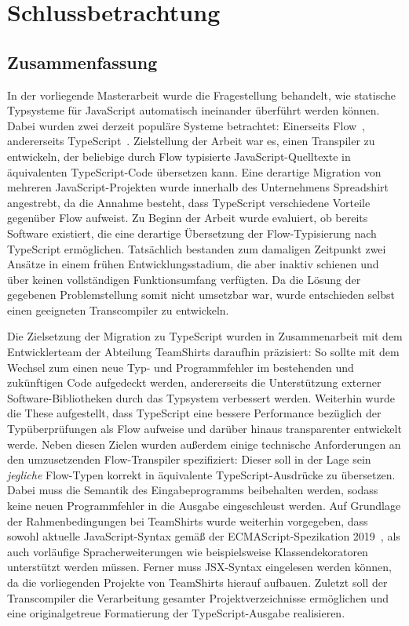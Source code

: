 \chapter{Schlussbetrachtung}
\label{chap:conclusion}

\section{Zusammenfassung}

In der vorliegende Masterarbeit wurde die Fragestellung behandelt, wie statische Typsysteme für JavaScript automatisch ineinander überführt werden können. Dabei wurden zwei derzeit populäre Systeme betrachtet: Einerseits Flow~\autocite{FLOW:PAPER}, andererseits TypeScript~\autocite{TYPESCRIPT:SPEC}. Zielstellung der Arbeit war es, einen Transpiler zu entwickeln, der beliebige durch Flow typisierte JavaScript-Quelltexte in äquivalenten TypeScript-Code übersetzen kann. Eine derartige Migration von mehreren JavaScript-Projekten wurde innerhalb des Unternehmens Spreadshirt angestrebt, da die Annahme besteht, dass TypeScript verschiedene Vorteile gegenüber Flow aufweist. Zu Beginn der Arbeit wurde evaluiert, ob bereits Software existiert, die eine derartige Übersetzung der Flow-Typisierung nach TypeScript ermöglichen. Tatsächlich bestanden zum damaligen Zeitpunkt zwei Ansätze in einem frühen Entwicklungsstadium, die aber inaktiv schienen und über keinen vollständigen Funktionsumfang verfügten. Da die Lösung der gegebenen Problemstellung somit nicht umsetzbar war, wurde entschieden selbst einen geeigneten Transcompiler zu entwickeln.

Die Zielsetzung der Migration zu TypeScript wurden in Zusammenarbeit mit dem Entwicklerteam der Abteilung TeamShirts daraufhin präzisiert: So sollte mit dem Wechsel zum einen neue Typ- und Programmfehler im bestehenden und zukünftigen Code aufgedeckt werden, andererseits die Unterstützung externer Software-Bibliotheken durch das Typsystem verbessert werden. Weiterhin wurde die These aufgestellt, dass TypeScript eine bessere Performance bezüglich der Typüberprüfungen als Flow aufweise und darüber hinaus transparenter entwickelt werde. Neben diesen Zielen wurden außerdem einige technische Anforderungen an den umzusetzenden Flow-Transpiler spezifiziert: Dieser soll in der Lage sein \emph{jegliche} Flow-Typen korrekt in äquivalente TypeScript-Ausdrücke zu übersetzen. Dabei muss die Semantik des Eingabeprogramms beibehalten werden, sodass keine neuen Programmfehler in die Ausgabe eingeschleust werden. Auf Grundlage der Rahmenbedingungen bei TeamShirts wurde weiterhin vorgegeben, dass sowohl aktuelle JavaScript-Syntax gemäß der ECMAScript-Spezikation 2019~\autocite{ECMASCRIPT:2019}, als auch vorläufige Spracherweiterungen wie beispielsweise Klassendekoratoren unterstützt werden müssen. Ferner muss JSX-Syntax eingelesen werden können, da die vorliegenden Projekte von TeamShirts hierauf aufbauen. Zuletzt soll der Transcompiler die Verarbeitung gesamter Projektverzeichnisse ermöglichen und eine originalgetreue Formatierung der TypeScript-Ausgabe realisieren.

